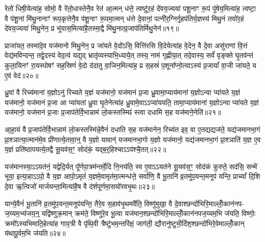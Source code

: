 रेतो॑ धिषी॒येत्या॑ह॒ सोमो॒ वै रे॑तो॒धास्तेनै॒व रेत॑ आ॒त्मन् ध॑त्ते॒ त्वष्टु॑र॒हं दे॑वय॒ज्यया॑ पशू॒नाꣳ रू॒पं पु॑षेय॒मित्या॑ह॒ त्वष्टा॒ वै प॑शू॒नां मि॑थु॒नानाꣳ॑ रूप॒कृत्तेनै॒व प॑शू॒नाꣳ रू॒पमा॒त्मन् ध॑त्ते दे॒वानां॒ पत्नी॑र॒ग्निर्गृ॒हप॑तिर्य॒ज्ञस्य॑ मिथु॒नं तयो॑र॒हं दे॑वय॒ज्यया॑ मिथु॒नेन॒ प्र भू॑यास॒मित्या॑है॒तस्मा॒द्वै मि॑थु॒नात्प्र॒जाप॑तिर्मिथु॒नेन॑॥१९॥

प्राजा॑यत॒ तस्मा॑दे॒व यज॑मानो मिथु॒नेन॒ प्र जा॑यते वे॒दो॑\-ऽसि॒ वित्ति॑रसि वि॒देयेत्या॑ह वे॒देन॒ वै दे॒वा असु॑राणां वि॒त्तं वेद्य॑मविन्दन्त॒ तद्वे॒दस्य॑ वेद॒त्वं यद्य॒द् भ्रातृ॑व्यस्याभि॒ध्याये॒त् तस्य॒ नाम॑ गृह्णीया॒त् तदे॒वास्य॒ सर्वं॑ वृङ्क्ते घृ॒तव॑न्तं कुला॒यिनꣳ॑ रा॒यस्पोषꣳ॑ सह॒स्रिणं॑ वे॒दो द॑दातु वा॒जिन॒मित्या॑ह॒ प्र स॒हस्रं॑ प॒शूना᳚प्नो॒त्या\-ऽस्य॑ प्र॒जायां᳚ वा॒जी जा॑यते॒ य ए॒वं वेद॑॥२०॥

{\anuvakamend[{द॒र्॒\mbox{}श॒पू॒र्ण॒मा॒सयो॑रुभ॒यतो॑ देवा॒श्वाः सु॒रेताः᳚ प्र॒जाप॑तिर्मिथु॒नेना᳚\-ऽ\-ऽप्नोत्य॒ष्टौ च॑॥४॥}]}

ध्रु॒वां वै रिच्य॑मानां य॒ज्ञो\-ऽनु॑ रिच्यते य॒ज्ञं यज॑मानो॒ यज॑मानं प्र॒जा ध्रु॒वामा॒प्याय॑मानां य॒ज्ञो\-ऽन्वा प्या॑यते य॒ज्ञं यज॑मानो॒ यज॑मानं प्र॒जा आ प्या॑यतां ध्रु॒वा घृ॒तेनेत्या॑ह ध्रु॒वामे॒वा\-ऽ\-ऽप्या॑ययति॒ तामा॒प्याय॑मानां य॒ज्ञो\-ऽन्वा प्या॑यते य॒ज्ञं यज॑मानो॒ यज॑मानं प्र॒जाः प्र॒जाप॑तेर्वि॒भान्नाम॑ लो॒कस्तस्मिꣴ॑ स्त्वा दधामि स॒ह यज॑माने॒नेति॑॥२१॥

आ॒हा॒यं वै प्र॒जाप॑तेर्वि॒भान्नाम॑ लो॒कस्तस्मि॑न्ने॒वैनं॑ दधाति स॒ह यज॑मानेन॒ रिच्य॑त इव॒ वा ए॒तद्यद्यज॑ते॒ यद्य॑जमानभा॒गं प्रा॒श्ञात्या॒त्मान॑मे॒व प्री॑णात्ये॒तावा॒न्॒ वै य॒ज्ञो यावान्॑ यजमानभा॒गो य॒ज्ञो यज॑मानो॒ यद्य॑जमानभा॒गं प्रा॒श्ञाति॑ य॒ज्ञ ए॒व य॒ज्ञं प्रति॑ष्ठापयत्ये॒तद्वै सू॒यव॑स॒ꣳ॒ सोद॑कं॒ यद्ब॒र्॒\mbox{}हिश्चा\-ऽ\-ऽप॑श्चै॒तत्॥२२॥

यज॑मानस्या॒\-ऽ\-ऽयत॑नं॒ यद्वेदि॒र्यत् पू᳚र्णपा॒त्रम॑न्तर्वे॒दि नि॒नय॑ति॒ स्व ए॒वा\-ऽ\-ऽयत॑ने सू॒यव॑स॒ꣳ॒ सोद॑कं कुरुते॒ सद॑सि॒ सन्मे॑ भूया॒ इत्या॒हा\-ऽ\-ऽपो॒ वै य॒ज्ञ आपो॒\-ऽमृतं॑ य॒ज्ञमे॒वामृत॑मा॒त्मन्ध॑त्ते॒ सर्वा॑णि॒ वै भू॒तानि॑ व्र॒तमु॑प॒यन्त॒मनूप॑ यन्ति॒ प्राच्यां᳚ दि॒शि दे॒वा ऋ॒त्विजो॑ मार्जयन्ता॒मित्या॑है॒ष वै द॑र्\mbox{}शपूर्णमा॒सयो॑रवभृ॒थः॥२३॥

यान्ये॒वैनं॑ भू॒तानि॑ व्र॒तमु॑प॒यन्त॒मनूप॑यन्ति॒ तैरे॒व स॒हाव॑भृ॒थमवै॑ति॒ विष्णु॑मुखा॒ वै दे॒वाश्छन्दो॑भिरि॒माल्लोँ॒कान॑नप- ज॒य्यम॒भ्य॑जय॒न्॒ यद्वि॑ष्णुक्र॒मान् क्रम॑ते॒ विष्णु॑रे॒व भू॒त्वा यज॑मान॒श्छन्दो॑भिरि॒माल्लोँ॒कान॑नपज॒य्यम॒भि ज॑यति॒ विष्णोः॒ क्रमो᳚\-ऽस्यभिमाति॒हेत्या॑ह गाय॒त्री वै पृ॑थि॒वी त्रैष्टु॑भम॒न्तरि॑क्षं॒ जाग॑ती॒ द्यौरानु॑ष्टुभी॒र्दिश॒श्छन्दो॑भिरे॒वेमाल्लोँ॒कान् य॑थापू॒र्वम॒भि ज॑यति॥२४॥

